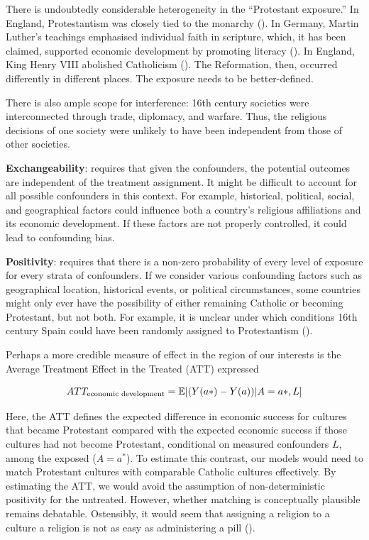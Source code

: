 \documentclass[
  singlecolumn,
  9pt]{article}
\begin{document}
There is undoubtedly considerable heterogeneity in the ``Protestant
exposure.'' In England, Protestantism was closely tied to the monarchy
(). In Germany, Martin
Luther's teachings emphasised individual faith in scripture, which, it
has been claimed, supported economic development by promoting literacy
(). In England,
King Henry VIII abolished Catholicism
(). The Reformation, then,
occurred differently in different places. The exposure needs to be
better-defined.

There is also ample scope for interference: 16th century societies were
interconnected through trade, diplomacy, and warfare. Thus, the
religious decisions of one society were unlikely to have been
independent from those of other societies.

\textbf{Exchangeability}: requires that given the confounders, the
potential outcomes are independent of the treatment assignment. It might
be difficult to account for all possible confounders in this context.
For example, historical, political, social, and geographical factors
could influence both a country's religious affiliations and its economic
development. If these factors are not properly controlled, it could lead
to confounding bias.

\textbf{Positivity}: requires that there is a non-zero probability of
every level of exposure for every strata of confounders. If we consider
various confounding factors such as geographical location, historical
events, or political circumstances, some countries might only ever have
the possibility of either remaining Catholic or becoming Protestant, but
not both. For example, it is unclear under which conditions 16th century
Spain could have been randomly assigned to Protestantism
().

Perhaps a more credible measure of effect in the region of our interests
is the Average Treatment Effect in the Treated (ATT) expressed

\[ATT_{\textnormal{economic~development}} = \mathbb{E}[(Y(a*)- Y(a))|A = a*,L]\]

Here, the ATT defines the expected difference in economic success for
cultures that became Protestant compared with the expected economic
success if those cultures had not become Protestant, conditional on
measured confounders \(L\), among the exposed (\(A = a^*\)). To estimate
this contrast, our models would need to match Protestant cultures with
comparable Catholic cultures effectively. By estimating the ATT, we
would avoid the assumption of non-deterministic positivity for the
untreated. However, whether matching is conceptually plausible remains
debatable. Ostensibly, it would seem that assigning a religion to a
culture a religion is not as easy as administering a pill
().
\end{document}
